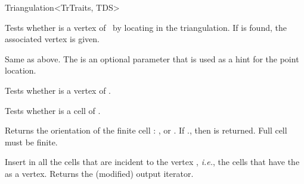 \begin{ccRefClass}{Triangulation<TrTraits, TDS>}








 {Tests
whether  is a vertex of \ccVar\ by locating  in the triangulation.  If
 is found, the associated vertex  is given.}

\ccGlue{} {Same as above.  The  is
an optional parameter that is used as a hint for the point location.}

\ccGlue{}
{Tests whether  is a vertex of \ccVar.}

{Tests whether  is a cell of \ccVar.}

{Returns the orientation of the finite cell :
\ccGlobalScope{}, \ccGlobalScope{} or
\ccGlobalScope{}. If \ccVar., then
\ccGlobalScope{} is returned. \ccPrecond Full cell  must be
finite.
}

{Insert in  all the cells that are incident to the vertex
, \emph{i.e.}, the cells that have the  as a vertex.
Returns the (modified) output iterator.
}


\end{ccRefClass}
